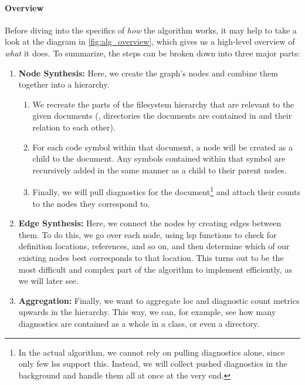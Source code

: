 \documentclass[../thesis]{subfiles}
\begin{document}
\paragraph{Overview}
Before diving into the specifics of \emph{how} the algorithm works, it may help to take a look at the diagram in \cref{fig:alg_overview}, which gives us a high-level overview of \emph{what} it does.
To summarize, the steps can be broken down into three major parts:
\begin{enumerate}[label=\bfseries\Roman*]
	\item \textbf{Node Synthesis:} Here, we create the graph's nodes and combine them together into a hierarchy.
	      \begin{enumerate}[label=\arabic*.]
		      \item We recreate the parts of the filesystem hierarchy that are relevant to the given documents (\ie, directories the documents are contained in and their relation to each other).
		      \item For each code symbol within that document, a node will be created as a child to the document.
		            Any symbols contained within that symbol are recursively added in the same manner as a child to their parent nodes.
		      \item Finally, we will pull diagnostics for the document\footnote{
			            In the actual algorithm, we cannot rely on pulling diagnostics alone, since only few \glspl{ls} support this.
			            Instead, we will collect pushed diagnostics in the background and handle them all at once at the very end.
		            } and attach their counts to the nodes they correspond to.
	      \end{enumerate}
	\item \textbf{Edge Synthesis:} Here, we connect the nodes by creating edges between them.
	      To do this, we go over each node, using \gls{lsp} functions to check for definition locations, references, and so on, and then determine which of our existing nodes best corresponds to that location.
	      This turns out to be the most difficult and complex part of the algorithm to implement efficiently, as we will later see.
	\item \textbf{Aggregation:} Finally, we want to aggregate \gls{loc} and diagnostic count metrics upwards in the hierarchy.
	      This way, we can, for example, see how many diagnostics are contained as a whole in a class, or even a directory.
\end{enumerate}
\end{document}
